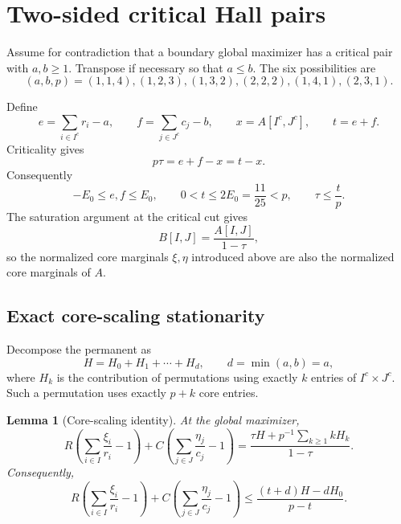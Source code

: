 \documentclass[11pt]{article}
\newtheorem{lemma}[theorem]{Lemma}
\theoremstyle{definition}
\begin{document}
\section{Two-sided critical Hall pairs}

Assume for contradiction that a boundary global maximizer has a critical
pair with $a,b\ge1$.  Transpose if necessary so that $a\le b$.  The six
possibilities are
\begin{equation}\label{eq:types}
 (a,b,p)=(1,1,4),(1,2,3),(1,3,2),(2,2,2),(1,4,1),(2,3,1).
\end{equation}

Define
\begin{equation}\label{eq:eftx}
 e=\sum_{i\in I^c}r_i-a,
 \qquad
 f=\sum_{j\in J^c}c_j-b,
 \qquad
 x=A[I^c,J^c],
 \qquad t=e+f.
\end{equation}
Criticality gives
\begin{equation}\label{eq:tau-eft}
 p\tau=e+f-x=t-x.
\end{equation}
Consequently
\begin{equation}\label{eq:two-sided-domain}
 -E_0\le e,f\le E_0,
 \qquad 0<t\le2E_0=\frac{11}{25}<p,
 \qquad \tau\le\frac tp.
\end{equation}
The saturation argument at the critical cut gives
\[
 B[I,J]=\frac{A[I,J]}{1-\tau},
\]
so the normalized core marginals $\xi,\eta$ introduced above are also the
normalized core marginals of $A$.

\subsection{Exact core-scaling stationarity}

Decompose the permanent as
\[
 H=H_0+H_1+\cdots+H_d,
 \qquad d=\min(a,b)=a,
\]
where $H_k$ is the contribution of permutations using exactly $k$ entries
of $I^c\times J^c$.  Such a permutation uses exactly $p+k$ core entries.

\begin{lemma}[Core-scaling identity]\label{lem:core-stationarity}
At the global maximizer,
\begin{equation}\label{eq:core-stationarity}
 R\left(\sum_{i\in I}\frac{\xi_i}{r_i}-1\right)
 +C\left(\sum_{j\in J}\frac{\eta_j}{c_j}-1\right)
 =\frac{\tau H+p^{-1}\sum_{k\ge1}kH_k}{1-\tau}.
\end{equation}
Consequently,
\begin{equation}\label{eq:stationarity-upper}
 R\left(\sum_{i\in I}\frac{\xi_i}{r_i}-1\right)
 +C\left(\sum_{j\in J}\frac{\eta_j}{c_j}-1\right)
 \le\frac{(t+d)H-dH_0}{p-t}.
\end{equation}
\end{lemma}
\end{document}
